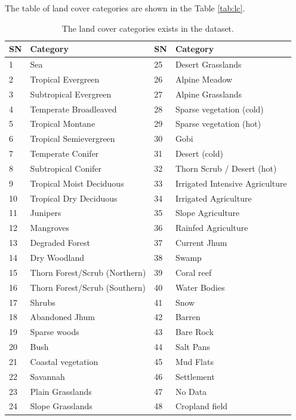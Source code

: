 \documentclass[a4paper, 12pt]{article}
\begin{document}
The table of land cover categories are shown in the Table \ref{tab:lc}.
\begin{table}[!h] %
\begin{tabular}{llll}
\hline
SN & Category                      & SN & Category                        \\ \hline
1  & Sea                           & 25 & Desert Grasslands               \\
2  & Tropical Evergreen            & 26 & Alpine Meadow                   \\
3  & Subtropical Evergreen         & 27 & Alpine Grasslands               \\
4  & Temperate Broadleaved         & 28 & Sparse vegetation (cold)        \\
5  & Tropical Montane              & 29 & Sparse vegetation (hot)         \\
6  & Tropical Semievergreen        & 30 & Gobi                            \\
7  & Temperate Conifer             & 31 & Desert (cold)                   \\
8  & Subtropical Conifer           & 32 & Thorn Scrub / Desert (hot)      \\
9  & Tropical Moist Deciduous      & 33 & Irrigated Intensive Agriculture \\
10 & Tropical Dry Deciduous        & 34 & Irrigated Agriculture           \\
11 & Junipers                      & 35 & Slope Agriculture               \\
12 & Mangroves                     & 36 & Rainfed Agriculture             \\
13 & Degraded Forest               & 37 & Current Jhum                    \\
14 & Dry Woodland                  & 38 & Swamp                           \\
15 & Thorn Forest/Scrub (Northern) & 39 & Coral reef                      \\
16 & Thorn Forest/Scrub (Southern) & 40 & Water Bodies                    \\
17 & Shrubs                        & 41 & Snow                            \\
18 & Abandoned Jhum                & 42 & Barren                          \\
19 & Sparse woods                  & 43 & Bare Rock                       \\
20 & Bush                          & 44 & Salt Pans                       \\
21 & Coastal vegetation            & 45 & Mud Flats                       \\
22 & Savannah                      & 46 & Settlement                      \\
23 & Plain Grasslands              & 47 & No Data                         \\
24 & Slope Grasslands              & 48 & Cropland field                  \\ \hline
\end{tabular}
\caption{The land cover categories exists in the dataset.}
\label{tbl:lc}
\end{table}
\end{document}
